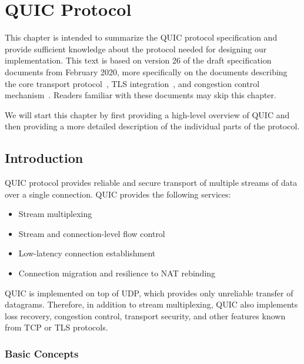 \chapter{QUIC Protocol}\label{chap:02-quic}

This chapter is intended to summarize the QUIC protocol specification and provide sufficient
knowledge about the protocol needed for designing our implementation. This text is based on version
26 of the draft specification documents from February 2020, more specifically on the documents
describing the core transport protocol~\cite{draft-ietf-quic-transport}, TLS
integration~\cite{draft-ietf-quic-tls}, and congestion control
mechanism~\cite{draft-ietf-quic-recovery}. Readers familiar with these documents may skip this
chapter.

We will start this chapter by first providing a high-level overview of QUIC and then providing a
more detailed description of the individual parts of the protocol.

\section{Introduction}

QUIC protocol provides reliable and secure transport of multiple streams of data over a single
connection. QUIC provides the following services:

\begin{itemize}

  \item Stream multiplexing

  \item Stream and connection-level flow control

  \item Low-latency connection establishment

  \item Connection migration and resilience to NAT rebinding

\end{itemize}

QUIC is implemented on top of UDP, which provides only unreliable transfer of datagrams. Therefore,
in addition to stream multiplexing, QUIC also implements loss recovery, congestion control,
transport security, and other features known from TCP or TLS protocols.

\subsection{Basic Concepts}

